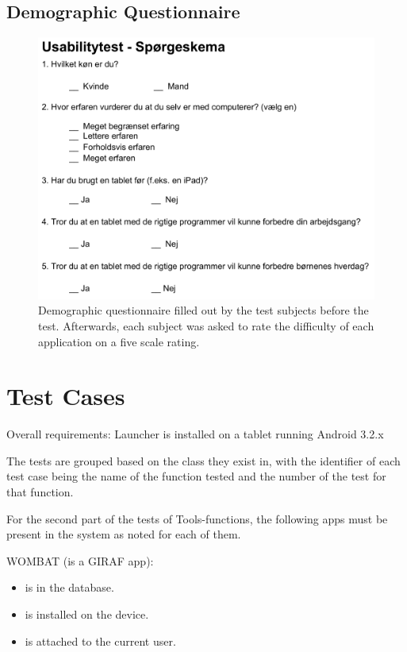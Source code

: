 \section{Demographic Questionnaire}
\begin{figure}[h!]
	\centering
	\includegraphics[scale=0.7]{gfx/usability-questionnaire.png}
	\caption{Demographic questionnaire filled out by the test subjects before the test. Afterwards, each subject was asked to rate the difficulty of each application on a five scale rating.}
	\label{fig:usability_questionnaire}
\end{figure}

\chapter{Test Cases}
\label{test_cases}
Overall requirements: \newline
Launcher is installed on a tablet running Android 3.2.x \newline

The tests are grouped based on the class they exist in, with the identifier of each test case being the name of the function tested and the number of the test for that function. \newline

For the second part of the tests of Tools-functions, the following apps must be present in the system as noted for each of them. \newline

WOMBAT (is a GIRAF app):
\begin{itemize}
\item is in the database.
\item is installed on the device.
\item is attached to the current user.
\end{itemize}

